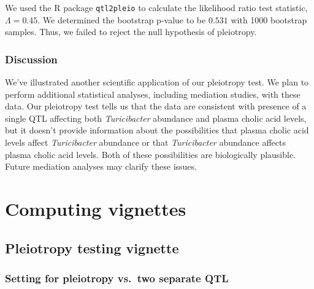 \documentclass[oneside]{book}
\begin{document}

We used the R package \texttt{qtl2pleio} \citep{qtl2pleio} to calculate the likelihood ratio test statistic, $\Lambda = 0.45$. We determined the bootstrap p-value to be $0.531$ with 1000 bootstrap samples. Thus, we failed to reject the null hypothesis of pleiotropy.


\subsection{Discussion}

We've illustrated another scientific application of our pleiotropy test. We plan to perform additional statistical analyses, including mediation studies, with these data. Our pleiotropy test tells us that the data are consistent with presence of a single QTL affecting both \emph{Turicibacter} abundance and plasma cholic acid levels, but it doesn't provide information about the possibilities that plasma cholic acid levels affect \emph{Turicibacter} abundance or that \emph{Turicibacter} abundance affects plasma cholic acid levels. Both of these possibilities are biologically plausible. Future mediation analyses may clarify these issues.





\chapter{Computing vignettes}


\section{Pleiotropy testing vignette}

\hypertarget{setting-for-pleiotropy-vs.two-separate-qtl}{%
\subsection{Setting for pleiotropy vs.~two separate
QTL}\label{setting-for-pleiotropy-vs.two-separate-qtl}}
\end{document}
